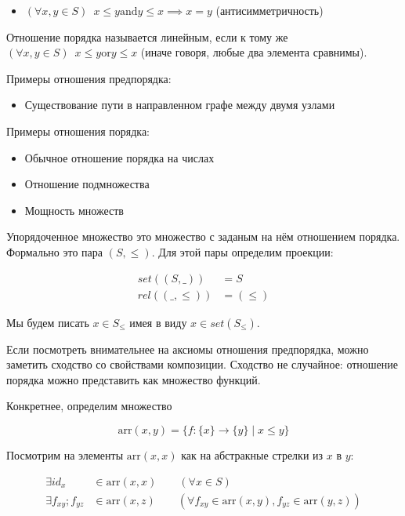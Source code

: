 \documentclass[10pt, a4paper]{article}
\newcommand{\fcomp}{\mathbin{\bm{;}}}
\theoremstyle{colon}
\begin{document}
\begin{itemize}
\item \( (\forall x, y \in S)\enspace x \leqslant y \mathbin\mathrm{and} y \leqslant x \implies x = y \) (антисимметричность)
\end{itemize}

Отношение порядка называется линейным, если к тому же \( (\forall x, y \in S)\enspace x \leqslant y \mathbin\mathrm{or} y \leqslant x \) (иначе говоря, любые два элемента сравнимы).

Примеры отношения предпорядка:

\begin{itemize}
\item Существование пути в направленном графе между двумя узлами
\end{itemize}

Примеры отношения порядка:

\begin{itemize}
\item Обычное отношение порядка на числах
\item Отношение подмножества
\item Мощность множеств
\end{itemize}

Упорядоченное множество это множество с заданым на нём отношением порядка. Формально это пара \( (S, \leqslant) \).
Для этой пары определим проекции:

\begin{align*}
set((S, \_)) &= S \\
rel((\_, \leqslant)) &= (\leqslant)
\end{align*}

Мы будем писать \( x \in S_{\leqslant} \) имея в виду \( x \in set(S_{\leqslant}) \).

Если посмотреть внимательнее на аксиомы отношения предпорядка, можно заметить сходство со свойствами
композиции. Сходство не случайное: отношение порядка можно представить как множество функций.

Конкретнее, определим множество

\[
\mathrm{arr}(x, y) = \{f : \{x\} \to \{y\} \mid x \leqslant y \}
\]

Посмотрим на элементы \( \mathrm{arr}(x, x) \) как на абстракные стрелки из \( x \) в \( y \):

\begin{align*}
\exists id_x &\in \mathrm{arr}(x, x) \qquad (\forall x \in S) \\
\exists f_{xy} \fcomp f_{yz} &\in \mathrm{arr}(x, z) \qquad (\forall f_{xy} \in \mathrm{arr}(x, y), f_{yz} \in \mathrm{arr}(y, z))
\end{align*}
\end{document}
